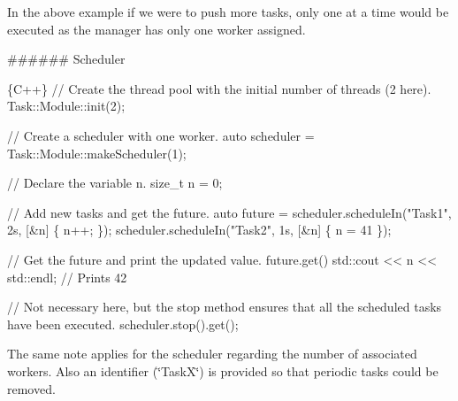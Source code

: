 In the above example if we were to push more tasks, only one at a time would be executed as the manager has only one worker assigned.

\#\#\#\#\#\# Scheduler 
\begin{DoxyCode}
\{C++\}
// Create the thread pool with the initial number of threads (2 here).
Task::Module::init(2);

// Create a scheduler with one worker.
auto scheduler = Task::Module::makeScheduler(1);

// Declare the variable n.
size\_t n = 0;

// Add new tasks and get the future.
auto future = scheduler.scheduleIn("Task1", 2s, [&n] \{ n++; \});
scheduler.scheduleIn("Task2", 1s, [&n] \{ n = 41 \});

// Get the future and print the updated value.
future.get()
std::cout << n << std::endl; // Prints 42

// Not necessary here, but the stop method ensures that all the scheduled tasks have been executed.
scheduler.stop().get();
\end{DoxyCode}


The same note applies for the scheduler regarding the number of associated workers. Also an identifier (\char`\"{}\+Task\+X\char`\"{}) is provided so that periodic tasks could be removed. 